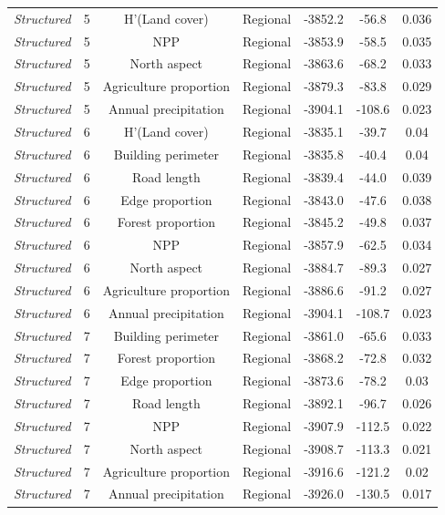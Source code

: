 \documentclass[preprint,final,times,12pt,3p]{elsarticle}
\begin{document}
\begin{longtable}{ c c c c c c c}
	\emph{Structured} & 5 & H'(Land cover) & Regional & -3852.2 & -56.8 & 0.036 \\
	\emph{Structured} & 5 & NPP & Regional & -3853.9 & -58.5 & 0.035 \\
	\emph{Structured} & 5 & North aspect & Regional & -3863.6 & -68.2 & 0.033 \\
	\emph{Structured} & 5 & Agriculture proportion & Regional & -3879.3 & -83.8 & 0.029 \\
	\emph{Structured} & 5 & Annual precipitation & Regional & -3904.1 & -108.6 & 0.023 \\
	\emph{Structured} & 6 & H'(Land cover) & Regional & -3835.1 & -39.7 & 0.04 \\
	\emph{Structured} & 6 & Building perimeter & Regional & -3835.8 & -40.4 & 0.04 \\
	\emph{Structured} & 6 & Road length & Regional & -3839.4 & -44.0 & 0.039 \\
	\emph{Structured} & 6 & Edge proportion & Regional & -3843.0 & -47.6 & 0.038 \\
	\emph{Structured} & 6 & Forest proportion & Regional & -3845.2 & -49.8 & 0.037 \\
	\emph{Structured} & 6 & NPP & Regional & -3857.9 & -62.5 & 0.034 \\
	\emph{Structured} & 6 & North aspect & Regional & -3884.7 & -89.3 & 0.027 \\
	\emph{Structured} & 6 & Agriculture proportion & Regional & -3886.6 & -91.2 & 0.027 \\
	\emph{Structured} & 6 & Annual precipitation & Regional & -3904.1 & -108.7 & 0.023 \\
	\emph{Structured} & 7 & Building perimeter & Regional & -3861.0 & -65.6 & 0.033 \\
	\emph{Structured} & 7 & Forest proportion & Regional & -3868.2 & -72.8 & 0.032 \\
	\emph{Structured} & 7 & Edge proportion & Regional & -3873.6 & -78.2 & 0.03 \\
	\emph{Structured} & 7 & Road length & Regional & -3892.1 & -96.7 & 0.026 \\
	\emph{Structured} & 7 & NPP & Regional & -3907.9 & -112.5 & 0.022 \\
	\emph{Structured} & 7 & North aspect & Regional & -3908.7 & -113.3 & 0.021 \\
	\emph{Structured} & 7 & Agriculture proportion & Regional & -3916.6 & -121.2 & 0.02 \\
	\emph{Structured} & 7 & Annual precipitation & Regional & -3926.0 & -130.5 & 0.017 \\

\end{longtable}
\end{document}

